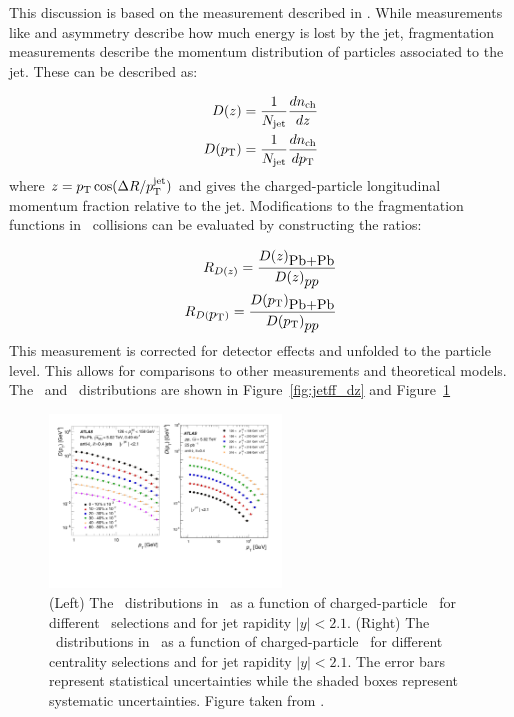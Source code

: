 This discussion is based on the measurement described in \cite{PhysRevC.98.024908}.
While measurements like \RAA \cite{} and asymmetry \cite{} describe how much energy is lost by the jet, fragmentation measurements describe the momentum distribution of particles associated to the jet.
These can be described as:

\begin{align}
\mbox{$D(z)$} = \frac{1}{\mbox{$N_{\mathrm{jet}}$}} \frac{d\mbox{$n_{\mathrm{ch}}$}}{dz} \\
\mbox{$D(\mbox{$p_{\mathrm{T}}$})$} = \frac{1}{\mbox{$N_{\mathrm{jet}}$}} \frac{d\mbox{$n_{\mathrm{ch}}$}}{d\mbox{$p_{\mathrm{T}}$}}
\end{align}
where $z = \mbox{$p_{\mathrm{T}}$} \cos(\Delta R / \mbox{$p_{\mathrm{T}}^{\mathrm{jet}}$})$ and gives the charged-particle longitudinal momentum fraction relative to the jet.
Modifications to the fragmentation functions in \pbpb\ collisions can be evaluated by constructing the ratios: 

\begin{align}
\mbox{$R_{D(z)}$} = \frac{\mbox{$D(z)$}_{\mbox{Pb+Pb}}}{\mbox{$D(z)$}_{\mbox{$pp$}}} \\
\mbox{$R_{D(\mbox{$p_{\mathrm{T}}$})}$} = \frac{\mbox{$D(\mbox{$p_{\mathrm{T}}$})$}_{\mbox{Pb+Pb}}}{\mbox{$D(\mbox{$p_{\mathrm{T}}$})$}_{\mbox{$pp$}}} 
\end{align}
This measurement is corrected for detector effects and unfolded to the particle level.
This allows for comparisons to other measurements and theoretical models.
The \Dz\ and \Dpt\ distributions are shown in Figure~\ref{fig:jetff_dz} and Figure~\ref{fig:jetff_dpt} 

\begin{figure}[htbp]
\begin{center}
\includegraphics[width=0.55\textwidth]{figures/jetMeasurements/jetff_dpt}
\caption{(Left) The \Dpt\ distributions in \pp\ as a function of charged-particle \pt\ for different \ptjet\ selections and for jet rapidity $|y| < 2.1$.
(Right) The \Dpt\ distributions in \pbpb\ as a function of charged-particle \pt\ for different centrality selections and for jet rapidity $|y| < 2.1$.
The error bars represent statistical uncertainties while the shaded boxes represent systematic uncertainties.
Figure taken from \cite{PhysRevC.98.024908}.}
\label{fig:jetff_dpt}
\end{center}
\end{figure}


